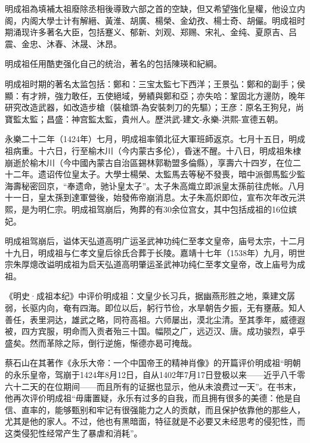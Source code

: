 明成祖為填補太祖廢除丞相後導致六部之首的空缺，但又希望強化皇權，他设立内阁，内阁大學士计有解縉、黃淮、胡廣、楊榮、金幼孜、楊士奇、胡儼。明成祖时期涌现许多著名大臣，包括蹇义、郁新、刘观、郑赐、宋礼、金纯、夏原吉、吕震、金忠、沐春、沐晟、沐昂。

明成祖任用酷吏强化自己的统治，著名的包括陳瑛和紀綱。

明成祖时期的著名太监包括：鄭和：三宝太監七下西洋；王景弘：鄭和的副手；侯顯：有才辨，強力敢任，五使絕域，勞績與鄭和亞；亦失哈：鞏固北方邊防，晚年研究改造武器，如改造步槍（裝槍頭-為安裝刺刀的先驅）；王彦：原名王狗兒，尚寶監太監；昌盛：神宫監太監，貴州人。歷洪武-建文-永樂-洪熙-宣德五朝。

永樂二十二年（1424年）七月，明成祖率領北征大軍班師返京。七月十五日，明成祖病重。十六日，行至榆木川（今内蒙古多伦），昏迷不醒。十八日，明成祖朱棣崩逝於榆木川（今中國內蒙古自治區錫林郭勒盟多倫縣），享壽六十四岁，在位二十二年。遗诏传位皇太子。大學士楊榮、太監馬去等秘不發喪，暗中派御馬監少監海壽秘密回京，“奉遗命，驰讣皇太子”。太子朱高熾立即派皇太孫前往虎帐。八月十一日，皇太孫到達軍營後，始發佈帝崩消息。太子朱高炽即位，宣布次年改元洪熙，是为明仁宗。明成祖驾崩后，殉葬的有30余位宫女，其中包括成祖的16位嫔妃。

明成祖驾崩后，谥体天弘道高明广运圣武神功纯仁至孝文皇帝，庙号太宗，十二月十九日，明成祖与仁孝文皇后徐氏合葬于长陵。嘉靖十七年（1538年）九月，明世宗朱厚熜改谥明成祖为启天弘道高明肇运圣武神功纯仁至孝文皇帝，改上庙号为成祖。

《明史·成祖本纪》中评价明成祖：文皇少长习兵，据幽燕形胜之地，乘建文孱弱，长驱内向，奄有四海。即位以后，躬行节俭，水旱朝告夕振，无有壅蔽。知人善任，表里洞达，雄武之略，同符高祖。六师屡出，漠北尘清。至其季年，威德遐被，四方宾服，明命而入贡者殆三十国。幅陨之广，远迈汉、唐。成功骏烈，卓乎盛矣。然而革除之际，倒行逆施，惭德亦曷可掩哉。

蔡石山在其著作《永乐大帝：一个中国帝王的精神肖像》的开篇评价明成祖“明朝的永乐皇帝，驾崩于1424年8月12日，自从1402年7月17日登极以来——近乎八千零六十二天的在位期间——而且所有的证据也显示，他从未浪费过一天”。在书末，他再次评价明成祖“毋庸置疑，永乐有过多的自我，而且拥有很多的美德：他是自信、直率的，能够甄别和牢记有很强能力之人的贡献，而且保护依靠他的那些人，尤其是他的家人。不过，他也有黑暗面，特征就是不必要又未经思考的侵犯性，而这类侵犯性经常产生了暴虐和消耗”。

